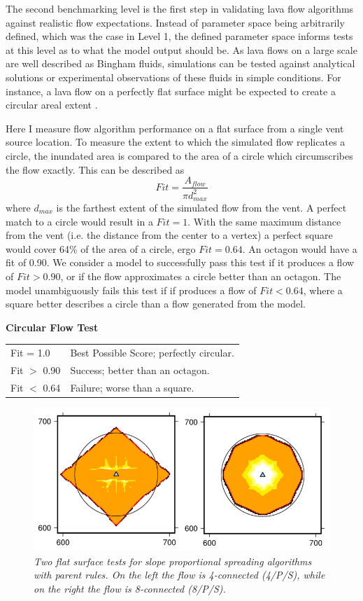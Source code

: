 \documentclass[12pt,letter]{article}
\begin{document}
	The second benchmarking level is the first step in validating lava flow algorithms against realistic flow expectations. Instead of parameter space being arbitrarily defined, which was the case in Level 1, the defined parameter space informs tests at this level as to what the model output should be. As lava flows on a large scale are well described as Bingham fluids, simulations can be tested against analytical solutions or experimental observations of these fluids in simple conditions. For instance, a lava flow on a perfectly flat surface might be expected to create a circular areal extent \citep{griffiths2000dynamics}.
	
			Here I measure flow algorithm performance on a flat surface from a single vent source location. To measure the extent to which the simulated flow replicates a circle, the inundated area is compared to the area of a circle which circumscribes the flow exactly. This can be described as
			\begin{equation}
				Fit = \frac{A_{flow}}{\pi d_{max}^2}
			\end{equation}
			where $d_{max}$ is the farthest extent of the simulated flow from the vent. A perfect match to a circle would result in a $Fit=1$. With the same maximum distance from the vent (i.e. the distance from the center to a vertex) a perfect square would cover 64\% of the area of a circle, ergo $Fit=0.64$. An octagon would have a fit of 0.90. We consider a model to successfully pass this test if it produces a flow of $Fit>0.90$, or if the flow approximates a circle better than an octagon. The model unambiguously fails this test if if produces a flow of $Fit<0.64$, where a square better describes a circle than a flow generated from the model.

			\begin{center}
				\textbf{Circular Flow Test}
				
				\begin{tabular}{l l}
					\toprule
					Fit = 1.0 & Best Possible Score; perfectly circular.\\
					Fit $>$ 0.90 & Success; better than an octagon. \\
					Fit $<$ 0.64 & Failure; worse than a square.\\
					\bottomrule
				\end{tabular}
			\end{center}
		
		\begin{figure}[!h]
		\centering
		\includegraphics[width=0.7\linewidth]{figures/pancake}
		\caption{\textit{Two flat surface tests for slope proportional spreading algorithms with parent rules. On the left the flow is 4-connected (4/P/S), while on the right the flow is 8-connected (8/P/S).}}
		\label{fig:pancake}
	\end{figure}
	
\end{document}
